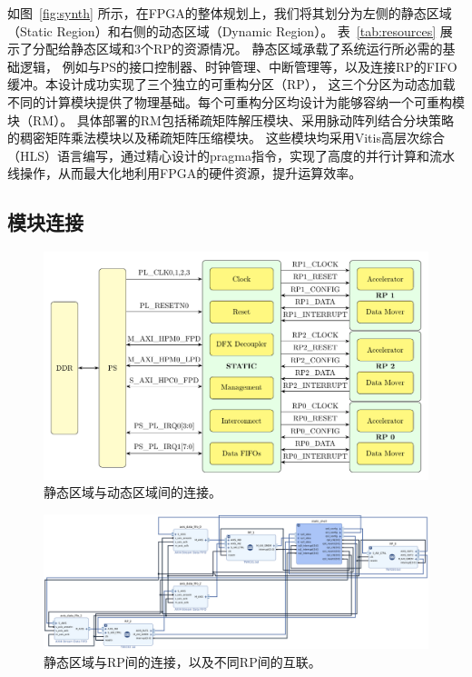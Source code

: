 如图~\ref{fig:synth} 所示，在FPGA的整体规划上，我们将其划分为左侧的静态区域（Static Region）和右侧的动态区域（Dynamic Region）。
表~\ref{tab:resources} 展示了分配给静态区域和3个RP的资源情况。
静态区域承载了系统运行所必需的基础逻辑，
例如与PS的接口控制器、时钟管理、中断管理等，以及连接RP的FIFO缓冲。本设计成功实现了三个独立的可重构分区（RP），
这三个分区为动态加载不同的计算模块提供了物理基础。每个可重构分区均设计为能够容纳一个可重构模块（RM）。
具体部署的RM包括稀疏矩阵解压模块、采用脉动阵列结合分块策略的稠密矩阵乘法模块以及稀疏矩阵压缩模块。
这些模块均采用Vitis高层次综合（HLS）语言编写，通过精心设计的pragma指令，实现了高度的并行计算和流水线操作，从而最大化地利用FPGA的硬件资源，提升运算效率。

\subsection{模块连接}

\begin{figure}[htbp]
\centerline{\includegraphics[width=0.8\columnwidth]{figures/arch.pdf}}
\caption{静态区域与动态区域间的连接。}
\label{fig:arch}
\end{figure}

\begin{figure}[htbp]
\centerline{\includegraphics[width=\columnwidth]{figures/dfx.png}}
\caption{静态区域与RP间的连接，以及不同RP间的互联。}
\label{fig:dfx}
\end{figure}

